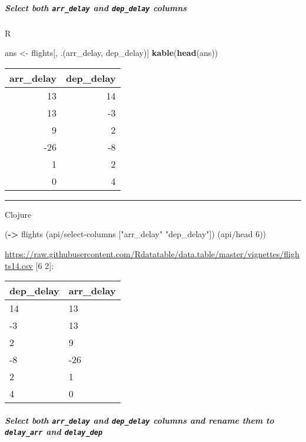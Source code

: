 \documentclass[]{article}
\newenvironment{Shaded}{\begin{snugshade}}{\end{snugshade}}
\newcommand{\KeywordTok}[1]{\textcolor[rgb]{0.13,0.29,0.53}{\textbf{#1}}}
\newcommand{\DecValTok}[1]{\textcolor[rgb]{0.00,0.00,0.81}{#1}}
\newcommand{\StringTok}[1]{\textcolor[rgb]{0.31,0.60,0.02}{#1}}
\newcommand{\NormalTok}[1]{#1}
\let\oldsubparagraph\subparagraph
\renewcommand{\subparagraph}[1]{\oldsubparagraph{#1}\mbox{}}
\begin{document}
\subparagraph{\texorpdfstring{Select both \texttt{arr\_delay} and
\texttt{dep\_delay}
columns}{Select both arr\_delay and dep\_delay columns}}\label{select-both-arr_delay-and-dep_delay-columns}

R

\begin{Shaded}
\begin{Highlighting}[]
\NormalTok{ans <-}\StringTok{ }\NormalTok{flights[, .(arr_delay, dep_delay)]}
\KeywordTok{kable}\NormalTok{(}\KeywordTok{head}\NormalTok{(ans))}
\end{Highlighting}
\end{Shaded}

\begin{longtable}[]{@{}rr@{}}
\toprule
arr\_delay & dep\_delay\tabularnewline
\midrule
\endhead
13 & 14\tabularnewline
13 & -3\tabularnewline
9 & 2\tabularnewline
-26 & -8\tabularnewline
1 & 2\tabularnewline
0 & 4\tabularnewline
\bottomrule
\end{longtable}

\begin{center}\rule{0.5\linewidth}{0.5pt}\end{center}

Clojure

\begin{Shaded}
\begin{Highlighting}[]
\NormalTok{(}\KeywordTok{->}\NormalTok{ flights}
\NormalTok{    (api/select-columns [}\StringTok{"arr_delay"} \StringTok{"dep_delay"}\NormalTok{])}
\NormalTok{    (api/head }\DecValTok{6}\NormalTok{))}
\end{Highlighting}
\end{Shaded}

\url{https://raw.githubusercontent.com/Rdatatable/data.table/master/vignettes/flights14.csv}
{[}6 2{]}:

\begin{longtable}[]{@{}ll@{}}
\toprule
dep\_delay & arr\_delay\tabularnewline
\midrule
\endhead
14 & 13\tabularnewline
-3 & 13\tabularnewline
2 & 9\tabularnewline
-8 & -26\tabularnewline
2 & 1\tabularnewline
4 & 0\tabularnewline
\bottomrule
\end{longtable}

\subparagraph{\texorpdfstring{Select both \texttt{arr\_delay} and
\texttt{dep\_delay} columns and rename them to \texttt{delay\_arr} and
\texttt{delay\_dep}}{Select both arr\_delay and dep\_delay columns and rename them to delay\_arr and delay\_dep}}\label{select-both-arr_delay-and-dep_delay-columns-and-rename-them-to-delay_arr-and-delay_dep}
\end{document}
